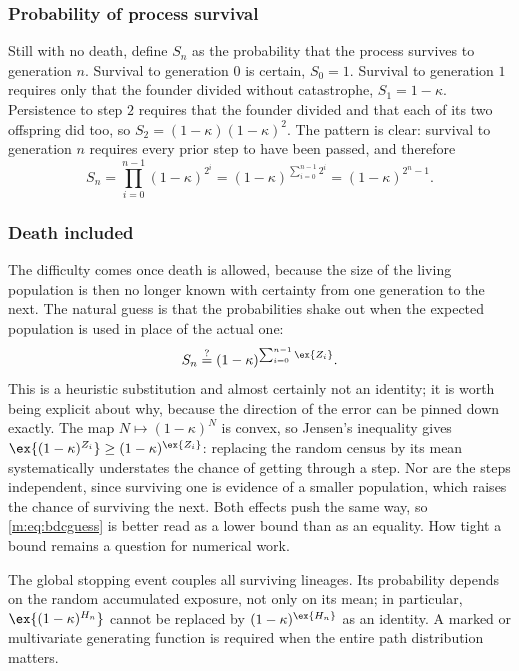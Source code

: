 \subsubsection*{Probability of process survival}

Still with no death, define $S_n$ as the probability that the process survives to
generation $n$. Survival to generation $0$ is certain, $S_0=1$. Survival to
generation $1$ requires only that the founder divided without catastrophe,
$S_1=1-\kappa$. Persistence to step $2$ requires that the founder divided and that
each of its two offspring did too, so $S_2 = (1-\kappa)(1-\kappa)^2$. The pattern
is clear: survival to generation $n$ requires every prior step to have been passed,
and therefore
\begin{equation}
\label{m:eq:bdcS}
S_n = \prod_{i=0}^{n-1}(1-\kappa)^{2^i}
= (1-\kappa)^{\sum_{i=0}^{n-1}2^i}
= (1-\kappa)^{2^n-1} .
\end{equation}

\subsubsection*{Death included}

The difficulty comes once death is allowed, because the size of the living
population is then no longer known with certainty from one generation to the next.
The natural guess is that the probabilities shake out when the expected population
is used in place of the actual one:
\begin{equation}
\label{m:eq:bdcguess}
S_n \overset{?}{=} (1-\kappa)^{\sum_{i=0}^{n-1}\ex{Z_i}} .
\end{equation}
This is a heuristic substitution and almost certainly not an identity; it is worth
being explicit about why, because the direction of the error can be pinned down
exactly. The map $N\mapsto(1-\kappa)^N$ is convex, so Jensen's inequality gives
$\ex{(1-\kappa)^{Z_i}}\ge(1-\kappa)^{\ex{Z_i}}$: replacing the random census by its
mean systematically understates the chance of getting through a step. Nor are the
steps independent, since surviving one is evidence of a smaller population, which
raises the chance of surviving the next. Both effects push the same way, so
\cref{m:eq:bdcguess} is better read as a lower bound than as an equality. How tight a
bound remains a question for numerical work.

\begin{remark}
The global stopping event couples all surviving lineages.  Its probability depends
on the random accumulated exposure, not only on its mean; in particular,
\(\ex{(1-\kappa)^{H_n}}\) cannot be replaced by
\((1-\kappa)^{\ex{H_n}}\) as an identity.  A marked or multivariate generating
function is required when the entire path distribution matters.
\end{remark}

